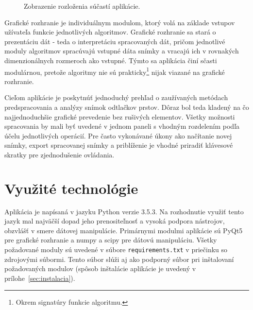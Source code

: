   \begin{figure}[h]
    \centering
    \caption{Zobrazenie rozloženia súčastí aplikácie.}
    \label{obr:sucasti_app}
  \end{figure}

  Grafické rozhranie je individuálnym modulom, ktorý volá na základe vstupov užívateľa funkcie jednotlivých algoritmov. Grafické rozhranie sa stará
  o prezentáciu dát - teda o interpretáciu spracovaných dát, pričom jednotlivé moduly algoritmov spracúvajú vstupné dáta snímky a vracajú ich v rovnakých
  dimenzionálnych rozmeroch ako vstupné. Týmto sa aplikácia činí sčasti modulárnou, pretože algoritmy nie sú prakticky\footnote{Okrem signatúry funkcie
  algoritmu.} nijak viazané na grafické rozhranie.

  Cieľom aplikácie je poskytnúť jednoduchý prehľad o zaužívaných metódach predspracovania a analýzy snímok odtlačkov prstov. Dôraz bol teda kladený na
  čo najjednoduchšie grafické prevedenie bez rušivých elementov. Všetky možnosti spracovania by mali byť uvedené v jednom paneli s vhodným rozdelením podľa
  účelu jednotlivých operácií. Pre často vykonávané úkony ako načítanie novej snímky, export spracovanej snímky a priblíženie je vhodné priradiť
  klávesové skratky pre zjednodušenie ovládania.

  \section{Využité technológie}
  Aplikácia je napísaná v jazyku Python verzie 3.5.3. Na rozhodnutie využiť tento jazyk mal najväčší dopad jeho prenositeľnosť a vysoká podpora nástrojov,
  obzvlášť v smere dátovej manipulácie. Primárnymi modulmi aplikácie sú PyQt5 pre grafické rozhranie a numpy a scipy pre dátovú manipuláciu. Všetky
  požadované moduly sú uvedené v súbore \texttt{requirements.txt} v priečinku so zdrojovými súbormi. Tento súbor slúži aj ako podporný súbor pri inštalovaní
  požadovaných modulov (spôsob inštalácie aplikácie je uvedený v prílohe~{\ref{sec:instalacia}}).

